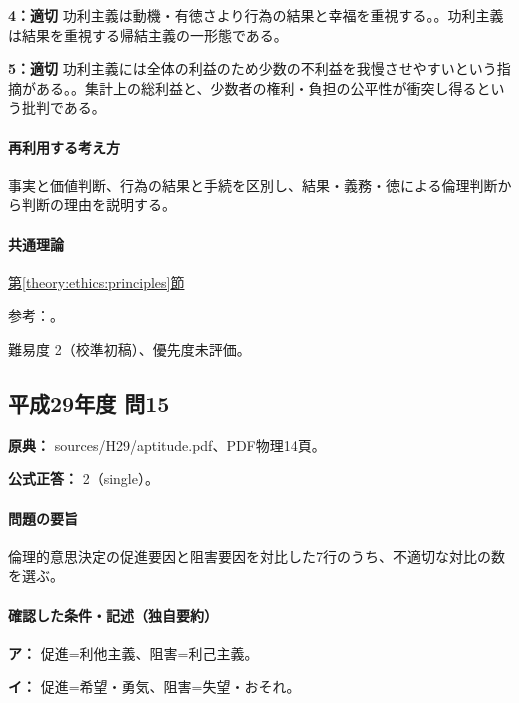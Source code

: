\noindent\textbf{4：適切} 功利主義は動機・有徳さより行為の結果と幸福を重視する。。功利主義は結果を重視する帰結主義の一形態である。\par

\noindent\textbf{5：適切} 功利主義には全体の利益のため少数の不利益を我慢させやすいという指摘がある。。集計上の総利益と、少数者の権利・負担の公平性が衝突し得るという批判である。\par

\paragraph{再利用する考え方} 事実と価値判断、行為の結果と手続を区別し、結果・義務・徳による倫理判断から判断の理由を説明する。

\paragraph{共通理論} \hyperref[theory:ethics:principles]{第\ref*{theory:ethics:principles}節}

\par 参考：\cite{scu_ethics_framework}。

\par 難易度 2（校準初稿）、優先度未評価。

\subsection{平成29年度 問15}
\label{q:h29-reg-apt-15}

\noindent\textbf{原典：} sources/H29/aptitude.pdf、PDF物理14頁。

\textbf{公式正答：} 2（single）。

\paragraph{問題の要旨} 倫理的意思決定の促進要因と阻害要因を対比した7行のうち、不適切な対比の数を選ぶ。

\paragraph{確認した条件・記述（独自要約）}\mbox{}\par

\noindent\textbf{ア：} 促進=利他主義、阻害=利己主義。\par

\noindent\textbf{イ：} 促進=希望・勇気、阻害=失望・おそれ。\par


